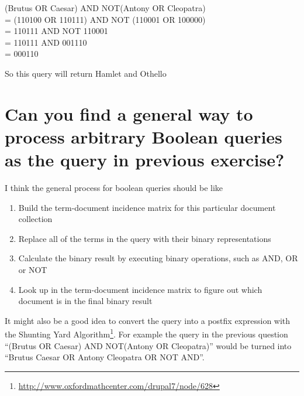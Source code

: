 \documentclass[11pt]{article} %
\begin{document}
\noindent (Brutus OR Caesar) AND NOT(Antony OR Cleopatra)\\
= (110100 OR 110111) AND NOT (110001 OR 100000)\\
= 110111 AND NOT 110001\\
= 110111 AND 001110\\
= 000110

So this query will return Hamlet and Othello

\section*{Can you find a general way to process arbitrary Boolean queries as the query in previous exercise?}

I think the general process for boolean queries should be like

\begin{enumerate}
    \item Build the term-document incidence matrix for this particular document collection
    \item Replace all of the terms in the query with their binary representations
    \item Calculate the binary result by executing binary operations, such as AND, OR or NOT
    \item Look up in the term-document incidence matrix to figure out which document is in the final binary result
\end{enumerate}

It might also be a good idea to convert the query into a postfix expression with the Shunting Yard Algorithm\footnote{\url{http://www.oxfordmathcenter.com/drupal7/node/628}}. For example the query in the previous question ``(Brutus OR Caesar) AND NOT(Antony OR Cleopatra)'' would be turned into ``Brutus Caesar OR Antony Cleopatra OR NOT AND''.
\end{document}
